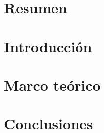 \documentclass[12pt,letterpaper]{article}
\begin{document}

\tableofcontents
\pagebreak
\section{Resumen}

\section{Introducción}

\section{Marco teórico}

\section{Conclusiones}


\nocite{*}

\end{document}

